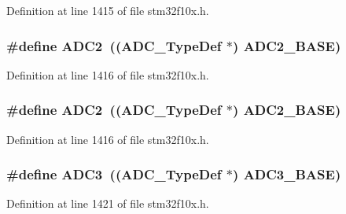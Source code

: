 Definition at line 1415 of file stm32f10x.\+h.

\subsubsection[{\texorpdfstring{A\+D\+C2}{ADC2}}]{\setlength{\rightskip}{0pt plus 5cm}\#define A\+D\+C2~(({\bf A\+D\+C\+\_\+\+Type\+Def} $\ast$) {\bf A\+D\+C2\+\_\+\+B\+A\+SE})}\hypertarget{group___peripheral__declaration_gac5503ae96c26b4475226f96715a1bf1e}{}\label{group___peripheral__declaration_gac5503ae96c26b4475226f96715a1bf1e}


Definition at line 1416 of file stm32f10x.\+h.

\subsubsection[{\texorpdfstring{A\+D\+C2}{ADC2}}]{\setlength{\rightskip}{0pt plus 5cm}\#define A\+D\+C2~(({\bf A\+D\+C\+\_\+\+Type\+Def} $\ast$) {\bf A\+D\+C2\+\_\+\+B\+A\+SE})}\hypertarget{group___peripheral__declaration_gac5503ae96c26b4475226f96715a1bf1e}{}\label{group___peripheral__declaration_gac5503ae96c26b4475226f96715a1bf1e}


Definition at line 1416 of file stm32f10x.\+h.

\subsubsection[{\texorpdfstring{A\+D\+C3}{ADC3}}]{\setlength{\rightskip}{0pt plus 5cm}\#define A\+D\+C3~(({\bf A\+D\+C\+\_\+\+Type\+Def} $\ast$) {\bf A\+D\+C3\+\_\+\+B\+A\+SE})}\hypertarget{group___peripheral__declaration_gae917784606daf6b04c9b7b96b40c2f74}{}\label{group___peripheral__declaration_gae917784606daf6b04c9b7b96b40c2f74}


Definition at line 1421 of file stm32f10x.\+h.

